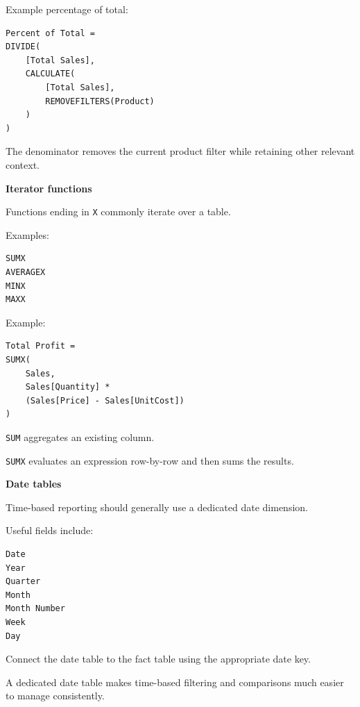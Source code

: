 \documentclass[11pt,letterpaper]{article}
\begin{document}
Example percentage of total:

\begin{lstlisting}
Percent of Total =
DIVIDE(
    [Total Sales],
    CALCULATE(
        [Total Sales],
        REMOVEFILTERS(Product)
    )
)
\end{lstlisting}

The denominator removes the current product filter while retaining other
relevant context.



\textbf{Iterator functions}

Functions ending in \texttt{X} commonly iterate over a table.

Examples:

\begin{lstlisting}
SUMX
AVERAGEX
MINX
MAXX
\end{lstlisting}

Example:

\begin{lstlisting}
Total Profit =
SUMX(
    Sales,
    Sales[Quantity] *
    (Sales[Price] - Sales[UnitCost])
)
\end{lstlisting}

\texttt{SUM} aggregates an existing column.

\texttt{SUMX} evaluates an expression row-by-row and then sums the results.



\textbf{Date tables}

Time-based reporting should generally use a dedicated date dimension.

Useful fields include:

\begin{lstlisting}
Date
Year
Quarter
Month
Month Number
Week
Day
\end{lstlisting}

Connect the date table to the fact table using the appropriate date key.

A dedicated date table makes time-based filtering and comparisons much easier
to manage consistently.


\end{document}
